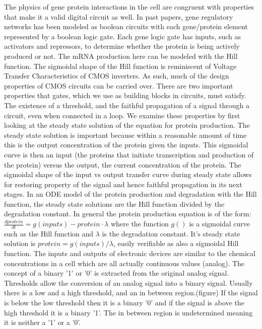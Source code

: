 \documentclass{article}
\begin{document}
The physics of gene protein interactions in the cell are congruent with properties that make it a valid digital circuit as well.  In past papers, gene regulatory networks has been modeled as boolean circuits with each gene/protein element represented by a boolean logic gate.  Each gene logic gate has inputs, such as activators and repressors, to determine whether the protein is being actively produced or not.  The mRNA production here can be modeled with the Hill function.  The sigmoidal shape of the Hill function is reminiscent of Voltage Transfer Characteristics of CMOS inverters.  As such, much of the design properties of CMOS circuits can be carried over.  There are two important properties that gates, which we use as building blocks in circuits, must satisfy.  The existence of a threshold, and the faithful propagation of a signal through a circuit, even when connected in a loop.  We examine these properties by first looking at the steady state solution of the equation for protein production.  The steady state solution is important because within a reasonable amount of time this is the output concentration of the protein given the inputs. This sigmoidal curve is then an input (the proteins that initiate transcription and production of the protein) versus the output, the current concentration of the protein.  The sigmoidal shape of the input vs output transfer curve during steady state allows for restoring property of the signal and hence faithful propagation in its next stages.   In an ODE model of the protein production and degradation with the Hill function, the steady state solutions are the Hill function divided by the degradation constant.  In general the protein production equation is of the form: $\frac{dprotein}{dt}=g(inputs)-protein\cdot\lambda$  where the function $g()$ is a sigmoidal curve such as the Hill function and $\lambda$ is the degradation constant.  It's steady state solution is $protein=g(inputs)/\lambda$, easily verifiable as also a sigmoidal Hill function.
\newline \newline
The inputs and outputs of electronic devices are similar to the chemical concentrations in a cell which are all actually continuous values (analog).  The concept of a binary '1' or '0' is extracted from the original analog signal.  Thresholds allow the conversion of an analog signal into a binary signal.  Usually there is a low and a high threshold, and an in between region.(figure)  If the signal is below the low threshold then it is a binary '0' and if the signal is above the high threshold it is a binary '1'.  The in between region is undetermined meaning it is neither a '1' or a '0'.   
\end{document}
